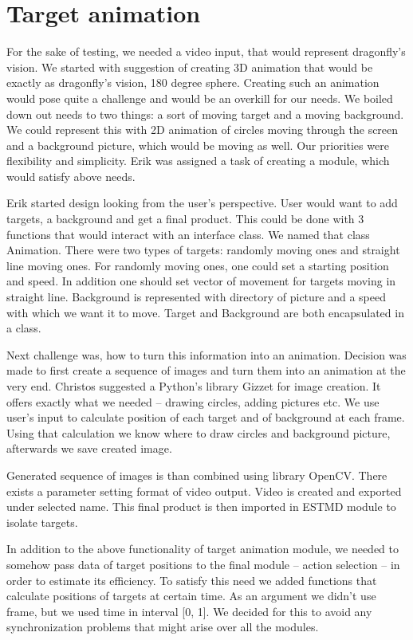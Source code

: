 \documentclass[hidelinks,a4paper,11pt]{article}
\begin{document}
\section{Target animation}

For the sake of testing, we needed a video input, that would represent dragonfly's vision. We started with suggestion of creating 3D animation that would be exactly as dragonfly's vision, 180 degree sphere. Creating such an animation would pose quite a challenge and would be an overkill for our needs. We boiled down out needs to two things: a sort of moving target and a moving background. We could represent this with 2D animation of circles moving through the screen and a background picture, which would be moving as well. Our priorities were flexibility and simplicity. Erik was assigned a task of creating a module, which would satisfy above needs.

Erik started design looking from the user's perspective. User would want to add targets, a background and get a final product. This could be done with 3 functions that would interact with an interface class. We named that class Animation. There were two types of targets: randomly moving ones and straight line moving ones. For randomly moving ones, one could set a starting position and speed. In addition one should set vector of movement for targets moving in straight line. Background is represented with directory of picture and a speed with which we want it to move. Target and Background are both encapsulated in a class.

Next challenge was, how to turn this information into an animation. Decision was made to first create a sequence of images and turn them into an animation at the very end. Christos suggested a Python's library Gizzet for image creation. It offers exactly what we needed – drawing circles, adding pictures etc. We use user's input to calculate position of each target and of background at each frame. Using that calculation we know where to draw circles and background picture, afterwards we save created image.

Generated sequence of images is than combined using library OpenCV. There exists a parameter setting format of video output. Video is created and exported under selected name. This final product is then imported in ESTMD module to isolate targets.

In addition to the above functionality of target animation module, we needed to somehow pass data of target positions to the final module – action selection – in order to estimate its efficiency. To satisfy this need we added functions that calculate positions of targets at certain time. As an argument we didn't use frame, but we used time in interval [0, 1]. We decided for this to avoid any synchronization problems that might arise over all the modules.
\end{document}
